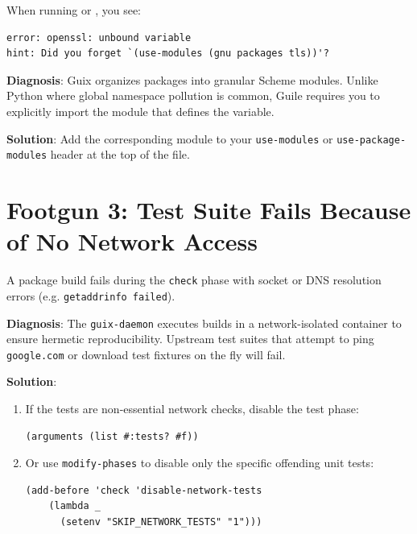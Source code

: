 \begin{tcolorbox}[colback=footgunred!5!white,colframe=footgunred,title=Symptom]
When running  or , you see:
\begin{lstlisting}[style=guixcli]
error: openssl: unbound variable
hint: Did you forget `(use-modules (gnu packages tls))'?
\end{lstlisting}
\end{tcolorbox}

\textbf{Diagnosis}: Guix organizes packages into granular Scheme modules. Unlike Python where global namespace pollution is common, Guile requires you to explicitly import the module that defines the variable.

\textbf{Solution}: Add the corresponding module to your \texttt{use-modules} or \texttt{use-package-modules} header at the top of the file.

\section{Footgun 3: Test Suite Fails Because of No Network Access}

\begin{tcolorbox}[colback=footgunred!5!white,colframe=footgunred,title=Symptom]
A package build fails during the \texttt{check} phase with socket or DNS resolution errors (e.g. \texttt{getaddrinfo failed}).
\end{tcolorbox}

\textbf{Diagnosis}: The \texttt{guix-daemon} executes builds in a network-isolated container to ensure hermetic reproducibility. Upstream test suites that attempt to ping \texttt{google.com} or download test fixtures on the fly will fail.

\textbf{Solution}:
\begin{enumerate}
  \item If the tests are non-essential network checks, disable the test phase:
  \begin{lstlisting}[style=guixscheme]
  (arguments (list #:tests? #f))
  \end{lstlisting}
  \item Or use \texttt{modify-phases} to disable only the specific offending unit tests:
  \begin{lstlisting}[style=guixscheme]
  (add-before 'check 'disable-network-tests
    (lambda _
      (setenv "SKIP_NETWORK_TESTS" "1")))
  \end{lstlisting}
\end{enumerate}

